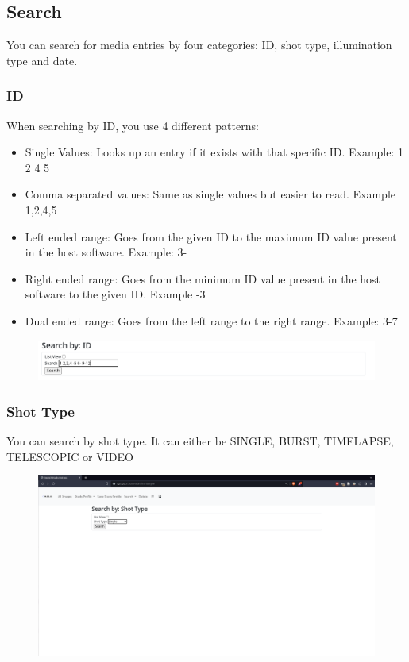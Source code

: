 \documentclass[12pt]{article}
\begin{document}
\begin{center}
	\subsection{Search}
	You can search for media entries by four categories: ID, shot type, illumination type and date.
	\subsubsection{ID}
	When searching by ID, you use 4 different patterns:
	\begin{itemize}
		\item Single Values: Looks up an entry if it exists with that specific ID. Example: 1 2 4 5
		\item Comma separated values: Same as single values but easier to read. Example 1,2,4,5
		\item Left ended range: Goes from the given ID to the maximum ID value present in the host software. Example: 3-
		\item Right ended range: Goes from the minimum ID value present in the host software to the given ID. Example -3
		\item Dual ended range: Goes from the left range to the right range. Example: 3-7
	\end{itemize}
	\begin{figure}[H]
		\includegraphics[width=\textwidth]{Figures/Search-By-Id.png}
	\end{figure}
	\subsubsection{Shot Type}
	You can search by shot type. It can either be SINGLE, BURST, TIMELAPSE, TELESCOPIC or VIDEO
	\begin{figure}[H]
		\includegraphics[width=\textwidth]{Figures/Search-By-Shot-Type.png}
	\end{figure}

\end{center}
\end{document}
